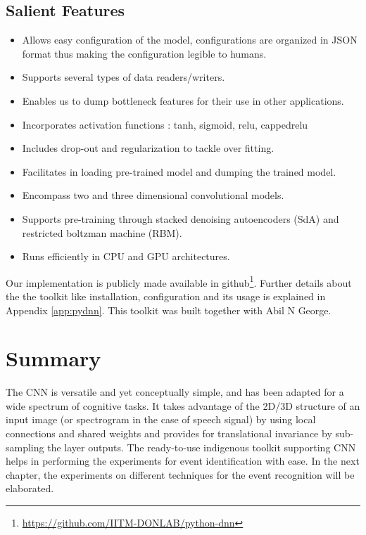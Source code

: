 \subsection{Salient Features}
\begin{itemize}
	\item Allows easy configuration of the model, configurations are organized in JSON format thus making the configuration legible to humans.
	\item Supports several types of data readers/writers. 
	\item Enables us to dump bottleneck features for their use in other applications.
	\item Incorporates activation functions : tanh, sigmoid, relu, cappedrelu
	\item Includes drop-out and regularization to tackle over fitting.
	\item Facilitates in loading pre-trained model and dumping the trained model.
	\item Encompass two and three dimensional convolutional models.
	\item Supports pre-training through stacked denoising autoencoders (SdA) and restricted boltzman machine (RBM).
	\item Runs efficiently in CPU and GPU architectures.	
\end{itemize}
Our implementation is publicly made available in github\footnote{\url{https://github.com/IITM-DONLAB/python-dnn}}.  Further details about the the toolkit like installation, configuration and its usage is explained in Appendix \ref{app:pydnn}. This toolkit was built together with Abil N George.
\clearpage

\section{Summary}
The CNN is versatile and yet conceptually simple, and has been adapted for a wide spectrum of cognitive tasks.  It takes advantage of the 2D/3D structure of an input image (or spectrogram in the case of speech signal) by using local connections and shared weights and provides for translational invariance by sub-sampling the layer outputs.  The ready-to-use indigenous toolkit supporting CNN helps in performing the experiments for event identification with ease.  In the next chapter, the experiments on different techniques for the event recognition will be elaborated.